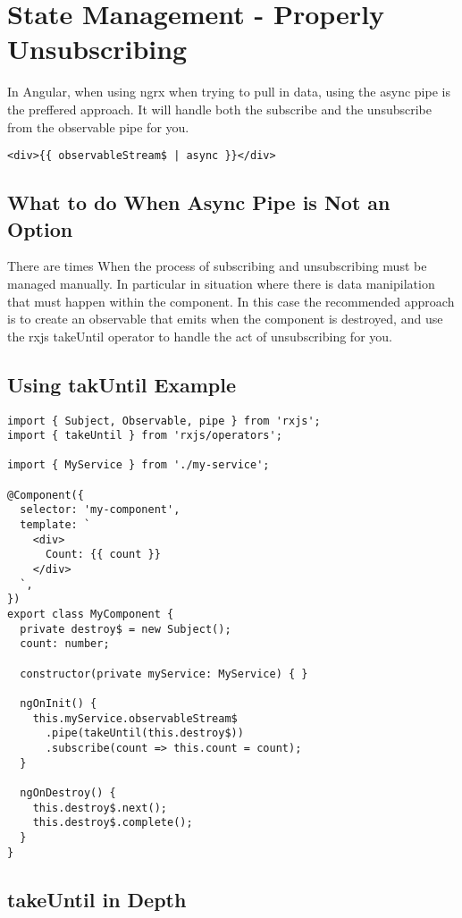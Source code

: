 
\section{ State Management - Properly Unsubscribing }

In Angular, when using ngrx when trying to pull in data, using the async pipe is
the preffered approach. It will handle both the subscribe and the unsubscribe
from the observable pipe for you.

\begin{lstlisting}
<div>{{ observableStream$ | async }}</div>
\end{lstlisting}

\subsection{ What to do When Async Pipe is Not an Option }
There are times When the process of subscribing and unsubscribing must be
managed manually. In particular in situation where there is data manipilation
that must happen within the component. In this case the recommended approach
is to create an observable that emits when the component is destroyed, and use
the rxjs takeUntil operator to handle the act of unsubscribing for you.

\subsection{Using takUntil Example}

\begin{lstlisting}
import { Subject, Observable, pipe } from 'rxjs';
import { takeUntil } from 'rxjs/operators';

import { MyService } from './my-service';

@Component({
  selector: 'my-component',
  template: `
    <div>
      Count: {{ count }}
    </div>
  `,
})
export class MyComponent {
  private destroy$ = new Subject();
  count: number;

  constructor(private myService: MyService) { }

  ngOnInit() {
    this.myService.observableStream$
      .pipe(takeUntil(this.destroy$))
      .subscribe(count => this.count = count);
  }

  ngOnDestroy() {
    this.destroy$.next();
    this.destroy$.complete();
  }
}
\end{lstlisting}

\subsection{takeUntil in Depth}

